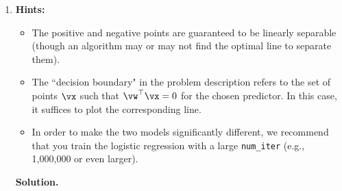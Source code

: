 \documentclass{article}
\theoremstyle{definition}
\theoremstyle{remark}
\newenvironment{Q}
{%
  \clearpage
  \item
  }
  {%
    \phantom{s} %
    \bigskip
    \textbf{Solution.}
  }
\begin{document}
\begin{enumerate}[font={\Large\bfseries},left=0pt]
\begin{Q}
\begin{enumerate}
  \textbf{Hints:}
  \begin{itemize}
      \item The positive and negative points are guaranteed to be linearly separable (though an algorithm may or may not find the optimal line to separate them).
      \item The ``decision boundary" in the problem description refers to the set of points $\vx$ such that $\vw^\top \vx = 0$ for the chosen predictor. In this case, it suffices to plot the corresponding line.
      \item In order to make the two models significantly different, we recommend that you train the logistic regression with a large \texttt{num\_iter} (e.g., 1,000,000 or even larger).
  \end{itemize}
  \end{enumerate}
  \end{Q}
\end{enumerate}
\end{document}
